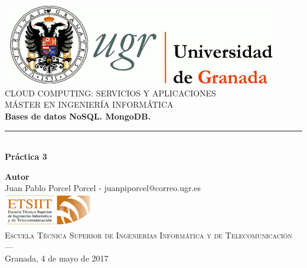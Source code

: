 \begin{titlepage}
 
 
\newlength{\centeroffset}
\setlength{\centeroffset}{-0.5\oddsidemargin}
\addtolength{\centeroffset}{0.5\evensidemargin}
\thispagestyle{empty}

\noindent\hspace*{\centeroffset}\begin{minipage}{\textwidth}

\centering
\includegraphics[width=0.9\textwidth]{images/logo_ugr.jpg}\\[1.4cm]

\textsc{ \Large CLOUD COMPUTING: SERVICIOS Y APLICACIONES\\[0.2cm]}
\textsc{ MÁSTER EN INGENIERÍA INFORMÁTICA }\\[1cm]
% 
{\Huge\bfseries Bases de datos NoSQL. MongoDB.}
\noindent\rule[-1ex]{\textwidth}{3pt}\\[3.5ex]
{\large\bfseries Práctica 3}
\end{minipage}

\vspace{4.5cm}
\noindent\hspace*{\centeroffset}\begin{minipage}{\textwidth}
\centering

\textbf{Autor}\\ {Juan Pablo Porcel Porcel - juanpiporcel@correo.ugr.es}\\[1cm]
\includegraphics[width=0.3\textwidth]{images/etsiit_logo.png}\\[0.1cm]
\textsc{Escuela Técnica Superior de Ingenierías Informática y de Telecomunicación}\\
\textsc{---}\\
Granada, 4 de mayo de 2017
\end{minipage}
\end{titlepage}


